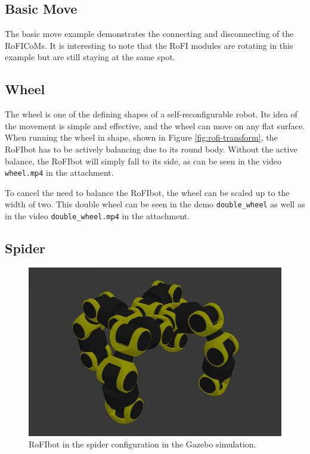 \documentclass[
  printed, %
  color,   %
  notable, %
  oneside, %
  nolof,   %
  nolot,   %
  nocover,
]{fithesis3}
\newcommand{\code}[1]{\texttt{#1}}
\begin{document}
\subsection{Basic Move}

The basic move example demonstrates the connecting and disconnecting of the RoFICoMs.
It is interesting to note that the RoFI modules are rotating in this example but are still staying at the same spot.

\subsection{Wheel}

The wheel is one of the defining shapes of a self-reconfigurable robot.
Its idea of the movement is simple and effective, and the wheel can move on any flat surface.
When running the wheel in shape, shown in Figure \ref{fig:rofi-transform}, the RoFIbot has to be actively balancing due to its round body.
Without the active balance, the RoFIbot will simply fall to its side, as can be seen in the video \code{wheel.mp4} in the attachment.

To cancel the need to balance the RoFIbot, the wheel can be scaled up to the width of two.
This double wheel can be seen in the demo \code{double\_wheel} as well as in the video \code{double\_wheel.mp4} in the attachment.

\subsection{Spider}

\begin{figure}
    \centering
    \includegraphics[width=.9\linewidth]{data/spider.jpg}
    \caption{RoFIbot in the spider configuration in the Gazebo simulation.}
    \label{fig:spider}
\end{figure}
\end{document}
